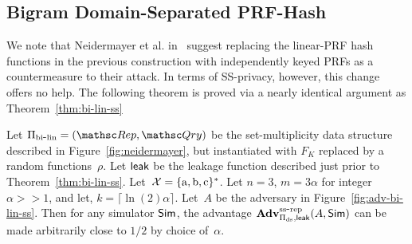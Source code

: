 \subsection{Bigram Domain-Separated PRF-Hash}
We note that Neidermayer et al. in~\cite{xxx} suggest replacing the linear-PRF hash functions in the previous construction with independently keyed PRFs as a countermeasure to their attack.  In terms of SS-privacy, however, this change offers no help.  The following theorem is proved via a nearly identical argument as Theorem~\ref{thm:bi-lin-ss}

\begin{theorem}\label{thm:bi-ds-ss}
Let $\setprim_{\bilin}= (\Rep, \Qry)$ be the set-multiplicity data structure described in Figure~\ref{fig:neidermayer}, but instantiated with $F_{K}$ replaced by a random functions~$\rho$.  Let ${\sf leak}$ be the leakage function described just prior to Theorem~\ref{thm:bi-lin-ss}.   Let~${\cal X}=\{\mathrm{a,b,c}\}^*$. Let $n=3$,  $m=3\alpha $ for integer $\alpha >> 1$, and let, $k = \lceil \ln(2) \alpha \rceil$.  Let~$A$ be the adversary in Figure~\ref{fig:adv-bi-lin-ss}.  Then for any simulator ${\sf Sim}$,
the advantage $\mathrm{\mathbf{Adv}}^{\mathrm{ss\mbox{-}rep}}_{\Pi_{\mathrm{ds}},{\sf leak}}(A,{\sf Sim})$ can be made arbitrarily close to $1/2$ by choice of~$\alpha$.
\end{theorem}


